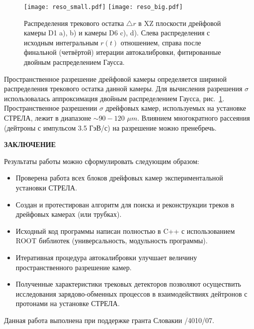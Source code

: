 \begin{figure}[h]
  \begin{center}
    \texttt{[image: reso\_small.pdf]}
    \texttt{[image: reso\_big.pdf]}
    \caption {Распределения трекового остатка $\triangle r$ в XZ плоскости
      дрейфовой камеры D1 a), b) и камеры D6 c), d). Слева распределения
      с исходным интегральным $r(t)$ отношением, справа после финальной
      (четвёртой) итерации автокалибровки, фитированные двойным распределением
      Гаусса.}
    \label{fig:final_res}
  \end{center}
\end{figure}

Пространственное разрешение дрейфовой камеры определяется шириной распределения
трекового остатка данной камеры. Для вычисления разрешения $\sigma$
использовалась аппроксимация двойным распределением Гаусса,
рис.~\ref{fig:final_res}. Пространственное разрешении $\sigma$ дрейфовых камер,
используемых на установке СТРЕЛА, лежит в диапазоне $\sim 90 - 120$ $\mu m$.
Влиянием многократного рассеяния (дейтроны с импульсом  3.5 ГэВ/с) на
разрешение можно пренебречь.

\vspace* {0.5cm}
\begin{center} \bf{ЗАКЛЮЧЕНИЕ} \end{center}

Результаты работы можно сформулировать следующим образом:
\begin{itemize}
\item Проверена работа всех блоков дрейфовых камер экспериментальной
  установки СТРЕЛА.
\item Создан и протестирован алгоритм для поиска и реконструкции треков
  в дрейфовых камерах (или трубках).
\item Исходный код программы написан полностью в C++ с использованием ROOT
  библиотек (универсальность, модульность программы).
\item Итеративная процедура автокалибровки улучшает величину пространственного
  разрешение камер.
\item Полученные характеристики трековых детекторов позволяют осуществить
  исследования зарядово-обменных процессов в взаимодействиях дейтронов
  с протонами на установке СТРЕЛА.
\end{itemize}

Данная работа выполнена при поддержке гранта Словакии /4010/07.



